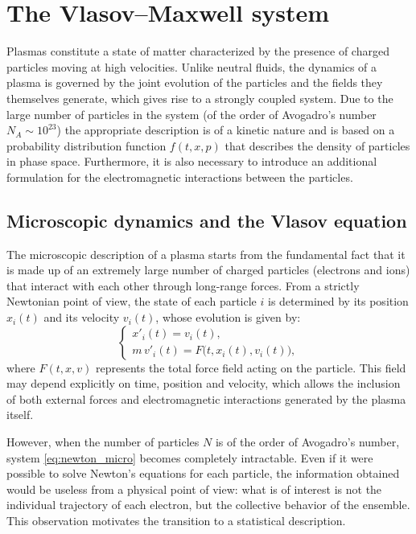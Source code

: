 \documentclass[11pt,a4paper,twoside,pdf]{article}
\numberwithin{equation}{section}
\begin{document}
\newpage

\section{The Vlasov--Maxwell system}

Plasmas constitute a state of matter characterized by the
presence of charged particles moving at high velocities.
Unlike neutral fluids, the dynamics of a plasma is governed by the
joint evolution of the particles and the fields they themselves generate, which
gives rise to a strongly coupled system. Due to the large number of particles in the system (of the order of Avogadro's number $N_A \sim 10^{23}$) the appropriate description is of a kinetic nature and is based on a
probability distribution function $f(t,x,p)$ that describes the density of particles in phase
space. Furthermore, it is also necessary to introduce an additional formulation for the electromagnetic interactions between the particles.








\subsection{Microscopic dynamics and the Vlasov equation}

The microscopic description of a plasma starts from the fundamental fact that it is
made up of an extremely large number of charged particles (electrons and
ions) that interact with each other through long-range forces. From a
strictly Newtonian point of view, the state of each particle $i$ is determined
by its position $x_i(t)$ and its velocity $v_i(t)$, whose evolution is given by:
\begin{equation}
\begin{cases}
x'_i(t) = v_i(t), \\[0.3em]
m\, v'_i(t) = F\big(t,x_i(t),v_i(t)\big),
\end{cases}
\label{eq:newton_micro}
\end{equation}
where $F(t,x,v)$ represents the total force field acting on the particle.
This field may depend explicitly on time, position and
velocity, which allows the inclusion of both external forces and electromagnetic
interactions generated by the plasma itself.

However, when the number of particles $N$ is of the order of
Avogadro's number, system \eqref{eq:newton_micro} becomes completely intractable.
Even if it were possible to solve Newton's equations for each particle, the
information obtained would be useless from a physical point of view: what is of interest is
not the individual trajectory of each electron, but the collective behavior of the
ensemble. This observation motivates the transition to a statistical description.
\end{document}
